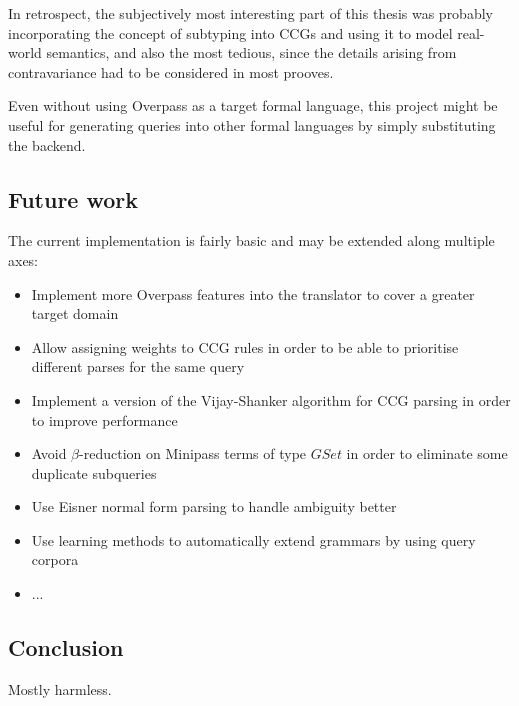 \documentclass[main.tex]{subfiles}
\begin{document}
In retrospect, the subjectively most interesting part of this thesis was probably
incorporating the concept of subtyping into CCGs and using it to model
real-world semantics, and also the most tedious, since the details arising
from contravariance had to be considered in most prooves.

Even without using Overpass as a target formal language, this project might be
useful for generating queries into other formal languages by simply
substituting the backend.

\pagebreak
\subsection{Future work}
The current implementation is fairly basic and may be extended along multiple
axes:

\begin{itemize}
    \item Implement more Overpass features into the translator to cover a greater
        target domain
    \item Allow assigning weights to CCG rules in order to be able to prioritise
        different parses for the same query
    \item Implement a version of the Vijay-Shanker algorithm for CCG parsing
        in order to improve performance
    \item Avoid $\beta$-reduction on Minipass terms of type $GSet$ in order
        to eliminate some duplicate subqueries
    \item Use Eisner normal form parsing to handle ambiguity better
    \item Use learning methods to automatically extend grammars by using
        query corpora
    \item ...
\end{itemize}

\subsection{Conclusion}
Mostly harmless.
\end{document}
